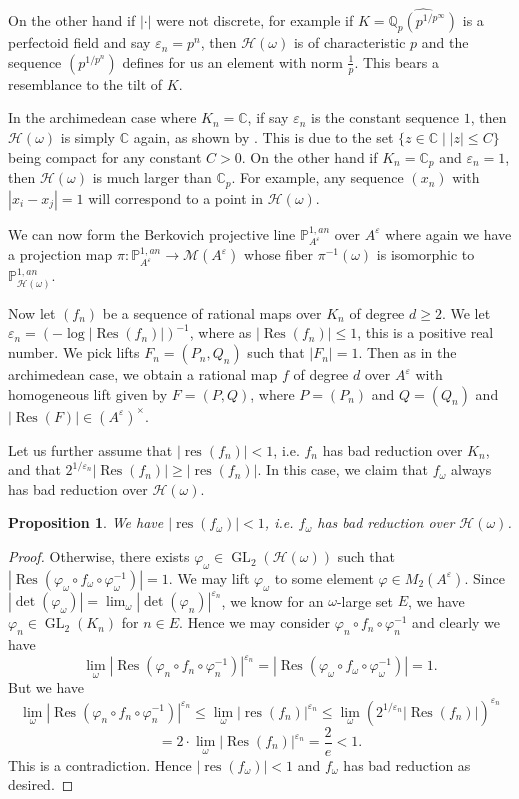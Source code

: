 \documentclass[10pt]{amsart}
\newcommand{\bb}{\mathbb}
\newcommand{\vphi}{\varphi}
\newcommand{\Res}{\operatorname{Res}}
\newcommand{\res}{\operatorname{res}}
\newcommand{\berkP}{\mathbb{P}^{1,an}}
\newcommand{\cal}{\mathcal}
\newcommand{\eps}{\varepsilon}
\newcommand{\GL}{\operatorname{GL}}
\numberwithin{theorem}{section}
\newtheorem{proposition}[theorem]{Proposition}
\numberwithin{example}{section}
\numberwithin{definition}{section}
\begin{document}
On the other hand if $| \cdot |$ were not discrete, for example if $K = \widehat{\bb{Q}_p(p^{1/p^{\infty}})}$ is a perfectoid field and say $\eps_n = p^n$, then $\cal{H}(\omega)$ is of characteristic $p$ and the sequence $(p^{1/p^n})$ defines for us an element with norm $\frac{1}{p}$. This bears a resemblance to the tilt of $K$.  
\par 
In the archimedean case where $K_n = \bb{C}$, if say $\eps_n$ is the constant sequence $1$, then $\cal{H}(\omega)$ is simply $\bb{C}$ again, as shown by \cite[Theorem 3.17]{FG24}. This is due to the set $\{z \in \bb{C} \mid |z| \leq C\}$ being compact for any constant $C > 0$. On the other hand if $K_n = \bb{C}_p$ and $\eps_n = 1$, then $\cal{H}(\omega)$ is much larger than $\bb{C}_p$. For example, any sequence $(x_n)$ with $|x_i - x_j| = 1$ will correspond to a point in $\cal{H}(\omega)$. 
\par 
We can now form the Berkovich projective line $\berkP_{A^{\eps}}$ over $A^{\eps}$ where again we have a projection map $\pi: \berkP_{A^{\eps}} \to \cal{M}(A^{\eps})$ whose fiber $\pi^{-1}(\omega)$ is isomorphic to $\berkP_{\cal{H}(\omega)}$. 
\par 
Now let $(f_n)$ be a sequence of rational maps over $K_n$ of degree $d \geq 2$. We let $\eps_n = (-\log |\Res(f_n)|)^{-1}$, where as $|\Res(f_n)| \leq 1$, this is a positive real number. We pick lifts $F_n = (P_n,Q_n)$ such that $|F_n| = 1$. Then as in the archimedean case, we obtain a rational map $f$ of degree $d$ over $A^{\eps}$ with homogeneous lift given by $F = (P,Q)$, where $P = (P_n)$ and $Q = (Q_n)$ and $|\Res(F)| \in (A^{\eps})^{\times}$. 
\par 
Let us further assume that $|\res(f_n)| < 1$, i.e. $f_n$ has bad reduction over $K_n$, and that $2^{1/\eps_n} |\Res(f_n)| \geq  |\res(f_n)|$. In this case, we claim that $f_{\omega}$ always has bad reduction over $\cal{H}(\omega)$. 

\begin{proposition} \label{BadReductionDegeneration1}
We have $|\res(f_{\omega})| < 1$, i.e. $f_{\omega}$ has bad reduction over $\cal{H}(\omega)$.
\end{proposition}

\begin{proof}
Otherwise, there exists $\vphi_{\omega} \in \GL_2(\cal{H}(\omega))$ such that $|\Res(\vphi_{\omega} \circ f_{\omega} \circ \vphi_{\omega}^{-1})| = 1$. We may lift $\vphi_{\omega}$ to some element $\vphi \in M_2(A^{\eps})$. Since $|\det(\vphi_{\omega})| = \lim_{\omega} |\det(\vphi_n)|^{\eps_n}$, we know for an $\omega$-large set $E$, we have $\vphi_n \in \GL_2(K_n)$ for $n \in E$. Hence we may consider $\vphi_n \circ f_n \circ \vphi_n^{-1}$ and clearly we have 
$$\lim_{\omega} |\Res(\vphi_n \circ f_n \circ \vphi_n^{-1})|^{\eps_n} = |\Res(\vphi_{\omega} \circ f_{\omega} \circ \vphi_{\omega}^{-1})| = 1.$$
But we have
$$\lim_{\omega} |\Res(\vphi_n \circ f_n \circ \vphi_n^{-1})|^{\eps_n} \leq \lim_{\omega} |\res(f_n)|^{\eps_n} \leq \lim_{\omega} \left(2^{1/\eps_n} |\Res(f_n)| \right)^{\eps_n}$$
$$= 2 \cdot \lim_{\omega} |\Res(f_n)|^{\eps_n} = \frac{2}{e} < 1.$$
This is a contradiction. Hence $|\res(f_{\omega})| < 1$ and $f_{\omega}$ has bad reduction as desired.
\end{proof}
\end{document}
